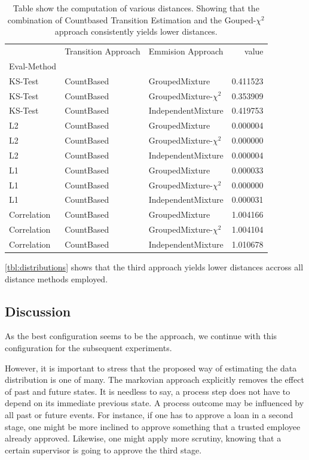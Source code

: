 \documentclass[./../../paper.tex]{subfiles}
\begin{document}
\begin{table}
    \caption{Table show the computation of various distances. Showing that the combination of Countbased Transition Estimation and the Gouped-$\chi^2$ approach consistently yields lower distances.}
    \label{tbl:distributions}
    \begin{tabular}{lllr}
     & Transition Approach & Emmision Approach & value \\
    Eval-Method &  &  &  \\
    KS-Test & CountBased & GroupedMixture & 0.411523 \\
    KS-Test & CountBased & GroupedMixture-$\chi^2$ & 0.353909 \\
    KS-Test & CountBased & IndependentMixture & 0.419753 \\
    L2 & CountBased & GroupedMixture & 0.000004 \\
    L2 & CountBased & GroupedMixture-$\chi^2$ & 0.000000 \\
    L2 & CountBased & IndependentMixture & 0.000004 \\
    L1 & CountBased & GroupedMixture & 0.000033 \\
    L1 & CountBased & GroupedMixture-$\chi^2$ & 0.000000 \\
    L1 & CountBased & IndependentMixture & 0.000031 \\
    Correlation & CountBased & GroupedMixture & 1.004166 \\
    Correlation & CountBased & GroupedMixture-$\chi^2$ & 1.004104 \\
    Correlation & CountBased & IndependentMixture & 1.010678 \\
    \end{tabular}
\end{table}

\autoref{tbl:distributions} shows that the third approach yields lower distances accross all distance methods employed.

\subsection{Discussion}
As the best configuration seems to be the  approach, we continue with this configuration for the subsequent experiments.

However, it is important to stress that the proposed way of estimating the data distribution is one of many. The markovian approach explicitly removes the effect of past and future states. It is needless to say, a process step does not have to depend on its immediate previous state. A process outcome may be influenced by all past or future events. For instance, if one has to approve a loan in a second stage, one might be more inclined to approve something that a trusted employee already approved. Likewise, one might apply more scrutiny, knowing that a certain supervisor is going to approve the third stage.
\end{document}
